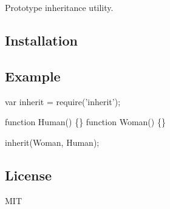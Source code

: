 Prototype inheritance utility.

\subsection*{Installation}




\subsection*{Example}


\begin{DoxyCode}
var inherit = require('inherit');

function Human() \{\}
function Woman() \{\}

inherit(Woman, Human);
\end{DoxyCode}


\subsection*{License}

M\+IT 